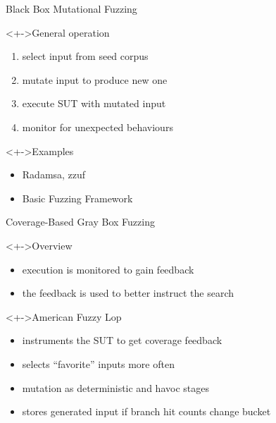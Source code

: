 \documentclass[\HandoutMode,table]{beamer}
\begin{document}
\begin{frame}{Black Box Mutational Fuzzing}
    \begin{block}<+->{General operation}
        \begin{enumerate}[<+->]
            \item{} select input from seed corpus
            \item{} mutate input to produce new one
            \item{} execute SUT with mutated input
            \item{} monitor for unexpected behaviours
        \end{enumerate}
    \end{block}
    \begin{exampleblock}<+->{Examples}
        \begin{itemize}
            \item{} Radamsa, zzuf
            \item{} Basic Fuzzing Framework
        \end{itemize}
    \end{exampleblock}
\end{frame}

\begin{frame}{Coverage-Based Gray Box Fuzzing}
    \begin{block}<+->{Overview}
        \begin{itemize}
            \item{} execution is monitored to gain \alert{feedback}
            \item{} the feedback is used to better instruct the search
        \end{itemize}
    \end{block}
    \begin{exampleblock}<+->{American Fuzzy Lop}
        \begin{itemize}
            \item{} instruments the SUT to get coverage feedback
            \item{} selects ``favorite'' inputs more often
            \item{} mutation as deterministic and havoc stages
            \item{} stores generated input if branch hit counts change bucket
        \end{itemize}
    \end{exampleblock}
\end{frame}
\end{document}
